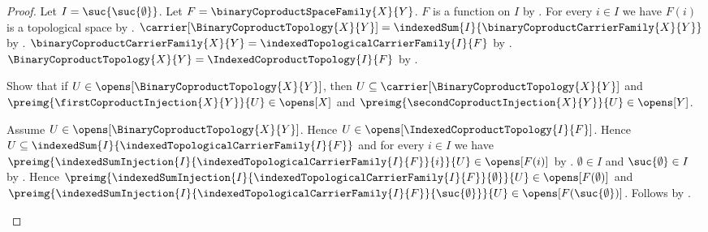 \begin{proof}
    Let $I=\suc{\suc{\emptyset}}$.
    Let $F=\binaryCoproductSpaceFamily{X}{Y}$.
    $F$ is a function on $I$ by
        .
    For every $i\in I$ we have $F(i)$ is a topological space by
        .
    $\carrier[\BinaryCoproductTopology{X}{Y}]
        =\indexedSum{I}{\binaryCoproductCarrierFamily{X}{Y}}$ by
        .
    $\binaryCoproductCarrierFamily{X}{Y}
        =\indexedTopologicalCarrierFamily{I}{F}$ by
        .
    $\BinaryCoproductTopology{X}{Y}
        =\IndexedCoproductTopology{I}{F}$ by
        .

    Show that if $U\in\opens[\BinaryCoproductTopology{X}{Y}]$, then
        $U\subseteq\carrier[\BinaryCoproductTopology{X}{Y}]$ and
        $\preimg{\firstCoproductInjection{X}{Y}}{U}\in\opens[X]$ and
        $\preimg{\secondCoproductInjection{X}{Y}}{U}\in\opens[Y]$.
    \begin{subproof}
        Assume $U\in\opens[\BinaryCoproductTopology{X}{Y}]$.
        Hence $U\in\opens[\IndexedCoproductTopology{I}{F}]$.
        Hence $U\subseteq\indexedSum{I}{
            \indexedTopologicalCarrierFamily{I}{F}}$ and
            for every $i\in I$ we have
                $\preimg{\indexedSumInjection{I}{
                    \indexedTopologicalCarrierFamily{I}{F}}{i}}{U}
                \in\opens[F(i)]$ by
            .
        $\emptyset\in I$ and $\suc{\emptyset}\in I$ by
            .
        Hence $\preimg{\indexedSumInjection{I}{
            \indexedTopologicalCarrierFamily{I}{F}}{\emptyset}}{U}
            \in\opens[F(\emptyset)]$ and
            $\preimg{\indexedSumInjection{I}{
                \indexedTopologicalCarrierFamily{I}{F}}{
                \suc{\emptyset}}}{U}
            \in\opens[F(\suc{\emptyset})]$.
        Follows by
            .
    \end{subproof}


\end{proof}
